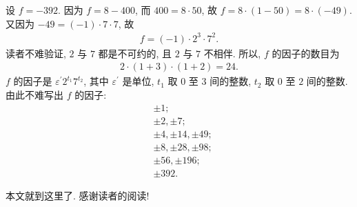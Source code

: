 \begin{example}
    设 $f = -392$. 因为 $f = 8 - 400$, 而 $400 = 8 \cdot 50$, 故 $f = 8 \cdot (1 - 50) = 8 \cdot (-49)$. 又因为 $-49 = (-1) \cdot 7 \cdot 7$, 故
    \begin{align*}
        f = (-1) \cdot 2^3 \cdot 7^2.
    \end{align*}
    读者不难验证, $2$ 与 $7$ 都是不可约的, 且 $2$ 与 $7$ 不相伴. 所以, $f$ 的因子的数目为
    \begin{align*}
        2 \cdot (1+3) \cdot (1+2) = 24.
    \end{align*}
    $f$ 的因子是 $\varepsilon^{\prime} 2^{t_1} 7^{t_2}$, 其中 $\varepsilon^{\prime}$ 是单位, $t_1$ 取 $0$ 至 $3$ 间的整数, $t_2$ 取 $0$ 至 $2$ 间的整数. 由此不难写出 $f$ 的因子:
    \begin{align*}
         & {\pm 1};                     \\
         & {\pm 2}, {\pm 7};            \\
         & {\pm 4}, {\pm 14}, {\pm 49}; \\
         & {\pm 8}, {\pm 28}, {\pm 98}; \\
         & {\pm 56}, {\pm 196};         \\
         & {\pm 392}.
    \end{align*}
\end{example}

本文就到这里了. 感谢读者的阅读!
